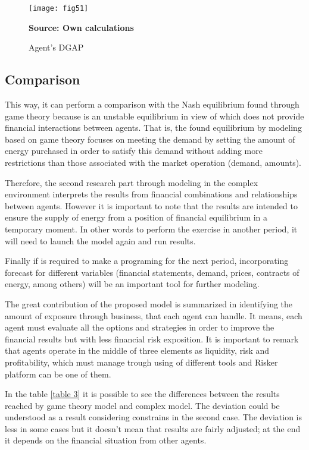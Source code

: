 \documentclass[12pt]{book}
\begin{document}
\begin{figure}  
\centering    
\texttt{[image: fig51]}  
\caption{Agent's DGAP}
\scriptsize 
\textbf{Source: Own calculations}
\captionsetup{justification=centering,margin=1cm}   
\label{Fig 51}
\end{figure}

\subsection{Comparison}

This way, it can perform a comparison with the Nash equilibrium found through game theory because is an unstable equilibrium in view of which does not provide financial interactions between agents. That is, the found equilibrium by modeling based on game theory focuses on meeting the demand by setting the amount of energy purchased in order to satisfy this demand without adding more restrictions than those associated with the market operation (demand, amounts).

Therefore, the second research part through modeling in the complex environment interprets the results from financial combinations and relationships between agents. However it is important to note that the results are intended to ensure the supply of energy from a position of financial equilibrium in a temporary moment. In other words to perform the exercise in another period, it will need to launch the model again and run results.

Finally if is required to make a programing for the next period, incorporating forecast for different variables (financial statements, demand, prices, contracts of energy, among others) will be an important tool for further modeling.

The great contribution of the proposed model is summarized in identifying the amount of exposure through business, that each agent can handle. It means, each agent must evaluate all the options and strategies in order to improve the financial results but with less financial risk exposition. It is important to remark that agents operate in the middle of three elements as liquidity, risk and profitability, which must manage trough using of different tools and Risker platform can be one of them.

In the table \ref{table 3} it is possible to see the differences between the results reached by game theory model and complex model. The deviation could be understood as a result considering constrains in the second case. The deviation is less in some cases but it doesn't mean that results are fairly adjusted; at the end it depends on the financial situation from other agents. 
\end{document}
